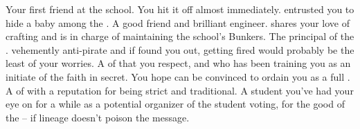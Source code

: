 \documentclass[char]{GL2020}
\begin{document}
\begin{contacts}
	\contact{\cEthics{}} Your first friend at the school. You hit it off almost immediately. \cEthics{\They} entrusted you to hide a baby among the \pShippies{}.
	\contact{\cBunker{}} A good friend and brilliant engineer. \cBunker{} shares your love of crafting and is in charge of maintaining the school's Bunkers.
	\contact{\cPrincipal{}} The principal of the \pSchool{}. \cPrincipal{\They} \cPrincipal{\are} vehemently anti-pirate and if \cPrincipal{\they} found you out, getting fired would probably be the least of your worries.
	\contact{\cFlowPriest{}} A \cFlowPriest{\cleric} of \cFlow{} that you respect, and who has been training you as an initiate of the faith in secret. You hope \cFlowPriest{\they} can be convinced to ordain you as a full \cPirate{\cleric}.
	\contact{\cEbbPriest{}} A \cEbbPriest{\cleric} of \cEbb{} with a reputation for being strict and traditional. 
\contact{\cWarlordDaughter{}} A student you've had your eye on for a while as a potential organizer of the student voting, for the good of the \pShip{} -- if \cWarlordDaughter{\their} lineage doesn't poison the message. 
\end{contacts}
\end{document}
